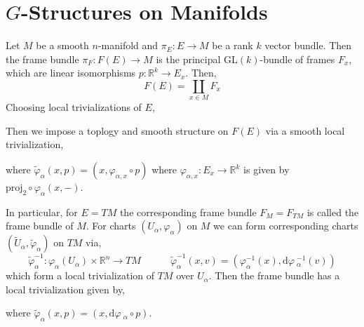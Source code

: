 \documentclass[12pt]{extarticle}
\newcommand{\R}{\mathbb{R}}
\renewcommand{\d}[1]{ \mathrm{d}#1 \:}
\theoremstyle{definition}
\newenvironment{definition}[1][Definition:]{\begin{trivlist}
\item[\hskip \labelsep {\bfseries #1}]}{\end{trivlist}}
\newcommand{\GL}[1]{\mathrm{GL}\left(#1\right)}
\begin{document}
\section{$G$-Structures on Manifolds}

\newcommand{\proj}{\mathrm{proj}}

\begin{definition}
Let $M$ be a smooth $n$-manifold and $\pi_E : E \to M$ be a rank $k$ vector bundle. Then the frame bundle $\pi_F : F(E) \to M$ is the principal $\GL{k}$-bundle of frames $F_x$, which are linear isomorphisms $p : \R^k \to E_x$. Then,
\[ F(E) = \coprod_{x \in M} F_x \]
Choosing local trivializations of $E$,
\begin{center}
\end{center}
Then we impose a toplogy and smooth structure on $F(E)$ via a smooth local trivialization,
\begin{center}
\end{center}
where $\tilde{\varphi}_\alpha(x, p) = (x, \varphi_{\alpha, x} \circ p)$ where $\varphi_{\alpha, x} : E_x \to \R^k$ is given by $\proj_2 \circ \varphi_\alpha(x, -)$. 
\end{definition}

\begin{definition}
In particular, for $E = TM$ the corresponding frame bundle $F_{M} = F_{TM}$ is called the frame bundle of $M$. For charts $(U_\alpha, \varphi_\alpha)$ on $M$ we can form corresponding charts $(\tilde{U}_\alpha, \tilde{\varphi}_\alpha)$ on $TM$ via,
\[ \tilde{\varphi}_\alpha^{-1} : \varphi_\alpha(U_\alpha) \times \R^n \to TM \quad \quad \quad \tilde{\varphi}_\alpha^{-1}(x, v) = (\varphi_\alpha^{-1}(x), \d{\varphi}_\alpha^{-1}(v)) \]
which form a local trivialization of $TM$ over $U_\alpha$. 
Then the frame bundle has a local trivialization given by,
\begin{center}
\end{center}
where $\tilde{\varphi}_\alpha(x, p) = (x, \d{\varphi}_\alpha \circ p)$. 
\end{definition}
\end{document}
